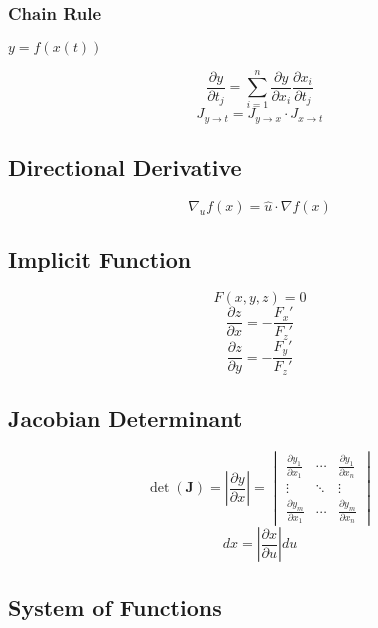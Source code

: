 \documentclass{article}
\begin{document}
\subsubsection{Chain Rule}

$y = f(x(t))$

\[
    \frac{\partial y}{\partial t_j} = \sum_{i=1}^n \frac{\partial y}{\partial x_i} \frac{\partial x_i}{\partial t_j}
\]
\[
    J_{y \to t} = J_{y \to x} \cdot J_{x \to t}
\]

\subsection{Directional Derivative}

\[
    \nabla_u f(x) = \hat{u} \cdot \nabla f(x)
\]

\subsection{Implicit Function}

\[
    F(x, y, z) = 0
\]
\[
    \frac{\partial z}{\partial x} = -\frac{F_x'}{F_z'}
\]
\[
    \frac{\partial z}{\partial y} = -\frac{F_y'}{F_z'}
\]

\subsection{Jacobian Determinant}

\[
    \det(\mathbf{J}) = \left|\frac{\partial y}{\partial x}\right| = \begin{vmatrix}
        \frac{\partial y_1}{\partial x_1} & \cdots & \frac{\partial y_1}{\partial x_n} \\
        \vdots & \ddots & \vdots \\
        \frac{\partial y_m}{\partial x_1} & \cdots & \frac{\partial y_m}{\partial x_n}
    \end{vmatrix}
\]
\[
    dx = \left|\frac{\partial x}{\partial u}\right| du
\]

\subsection{System of Functions}
\end{document}
